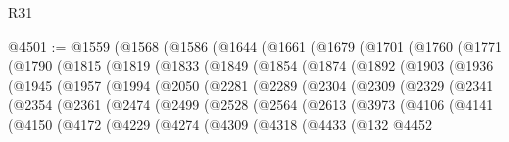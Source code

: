 \begin{lexlean}{R31}
\begin{coremodule}
@4501 := @1559
    (@1568
      (@1586
        (@1644
          (@1661
            (@1679
              (@1701
                (@1760
                  (@1771
                    (@1790
                      (@1815
                        (@1819
                          (@1833
                            (@1849
                              (@1854
                                (@1874
                                  (@1892
                                    (@1903
                                      (@1936
                                        (@1945
                                          (@1957
                                            (@1994
                                              (@2050
                                                (@2281
                                                  (@2289
                                                    (@2304
                                                      (@2309
                                                        (@2329
                                                          (@2341
                                                            (@2354
                                                              (@2361
                                                                (@2474
                                                                  (@2499
                                                                    (@2528
                                                                      (@2564
                                                                        (@2613
                                                                          (@3973
                                                                            (@4106
                                                                              (@4141
                                                                                (@4150
                                                                                  (@4172
                                                                                    (@4229
                                                                                      (@4274
                                                                                        (@4309
                                                                                          (@4318
                                                                                            (@4433
                                                                                              (@132
                                                                                                @4452

\end{coremodule}
\end{lexlean}
